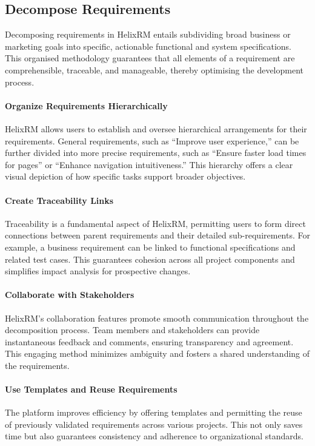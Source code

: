\subsection{Decompose Requirements}

Decomposing requirements in HelixRM entails subdividing
broad business or marketing goals into specific, actionable
functional and system specifications.
This organised methodology guarantees that all elements of a
requirement are comprehensible, traceable, and manageable,
thereby optimising the development process.

\paragraph{Organize Requirements Hierarchically}
HelixRM allows users to establish and oversee hierarchical
arrangements for their requirements.
General requirements, such as “Improve user experience,” can
be further divided into more precise requirements, such as
“Ensure faster load times for pages” or “Enhance navigation intuitiveness.”
This hierarchy offers a clear visual depiction of how specific tasks
support broader objectives.

\paragraph{Create Traceability Links}
Traceability is a fundamental aspect of HelixRM, permitting
users to form direct connections between parent requirements
and their detailed sub-requirements.
For example, a business requirement can be linked to functional
specifications and related test cases.
This guarantees cohesion across all project components and
simplifies impact analysis for prospective changes.

\paragraph{Collaborate with Stakeholders}
HelixRM’s collaboration features promote smooth communication
throughout the decomposition process.
Team members and stakeholders can provide instantaneous feedback
and comments, ensuring transparency and agreement.
This engaging method minimizes ambiguity and fosters a
shared understanding of the requirements.

\paragraph{Use Templates and Reuse Requirements}
The platform improves efficiency by offering templates
and permitting the reuse of previously validated
requirements across various projects.
This not only saves time but also guarantees consistency
and adherence to organizational standards.

